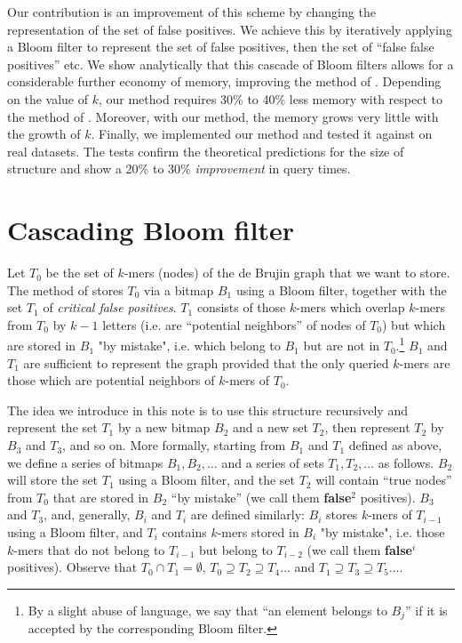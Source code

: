 \documentclass[pdftex]{llncs}\usepackage[T1]{fontenc}
\begin{document}
Our contribution is an improvement of this scheme by changing the
representation of the set of false positives. We achieve this by
iteratively applying a Bloom filter to represent the set of false
positives, then the set of ``false false positives'' etc. We show
analytically that this cascade of Bloom filters allows for a
considerable further economy of memory, improving the method of
\cite{DBLP:conf/wabi/ChikhiR12}. Depending on the value of $k$, our
method requires 30\% to 40\% less memory with respect to the method of
\cite{DBLP:conf/wabi/ChikhiR12}. Moreover, with our method, the memory
grows very little with the growth of $k$. Finally, we implemented our
method and tested it against \cite{DBLP:conf/wabi/ChikhiR12} on real
datasets. The tests confirm the theoretical predictions for the size
of structure and show a 20\% to 30\% \emph{improvement} in query
times.

\section{Cascading Bloom filter}

Let $T_0$ be the set of $k$-mers (nodes) of the de Brujin graph that we want
to store. The method of \cite{DBLP:conf/wabi/ChikhiR12} stores $T_0$
via a bitmap $B_1$ using a Bloom filter, together with the set $T_1$
of {\em critical false positives}. $T_1$ consists of those $k$-mers
which overlap $k$-mers from $T_0$ by $k-1$ letters (i.e. are
``potential neighbors'' of nodes of $T_0$) but which are stored in
$B_1$ "by mistake", i.e. which belong to $B_1$ but are not in
$T_0$.\footnote{By a slight abuse of language, we say that ``an
  element belongs to $B_j$'' if it is accepted by the corresponding
  Bloom filter.} $B_1$ and $T_1$ are sufficient to represent the graph
provided that the only queried $k$-mers are those which are potential neighbors of $k$-mers of $T_0$.

The idea we introduce in this note is to use this structure recursively and represent the set $T_1$ by a new bitmap $B_2$ and a new set $T_2$, then represent $T_2$ by $B_3$ and $T_3$, and so on.
More formally, starting from $B_1$ and $T_1$ defined as above, we define a series of bitmaps $B_1, B_2, \ldots$ and a series of sets $T_1,T_2,\ldots$
as follows.
$B_2$ will store the set $T_1$ using a Bloom filter, and the set $T_2$ will contain ``true nodes'' from $T_0$ that are stored in $B_2$ ``by mistake'' (we call them {\bf false$^{2}$} positives). $B_3$ and $T_3$, and, generally, $B_i$ and $T_i$ are defined similarly: $B_i$ stores $k$-mers of $T_{i-1}$ using a Bloom filter, and $T_i$ contains $k$-mers stored in $B_i$ "by mistake", i.e. those $k$-mers that do not belong to $T_{i-1}$ but belong to $T_{i-2}$ (we call them {\bf false}$^{i}$ positives). Observe that $T_0\cap T_1=\emptyset$, $T_0 \supseteq T_2 \supseteq T_4 \ldots$ and $T_1 \supseteq T_3 \supseteq T_5 \ldots$.
\end{document}
